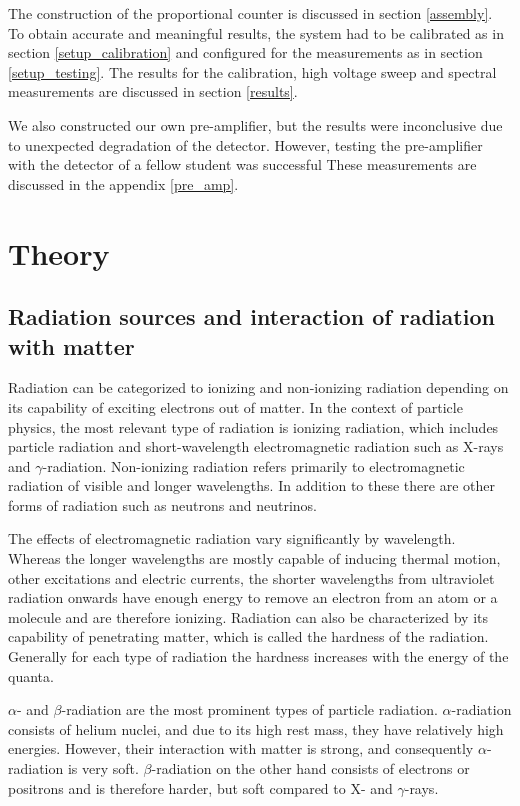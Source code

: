 \documentclass[a4paper]{article}
\begin{document}
The construction of the proportional counter is discussed in section \ref{assembly}.
To obtain accurate and meaningful results, the system had to be calibrated as in section \ref{setup_calibration} and configured for the measurements as in section \ref{setup_testing}.
The results for the calibration, high voltage sweep and spectral measurements are discussed in section \ref{results}.

We also constructed our own pre-amplifier, but the results were inconclusive due to unexpected degradation of the detector.
However, testing the pre-amplifier with the detector of a fellow student was successful
These measurements are discussed in the appendix \ref{pre_amp}.


\section{Theory}
\label{theory}

\subsection{Radiation sources and interaction of radiation with matter}
\label{sources_interaction}
Radiation can be categorized to ionizing and non-ionizing radiation depending on its capability of exciting electrons out of matter.
In the context of particle physics, the most relevant type of radiation is ionizing radiation, which includes particle radiation and short-wavelength electromagnetic radiation such as X-rays and $\gamma$-radiation.
Non-ionizing radiation refers primarily to electromagnetic radiation of visible and longer wavelengths.
In addition to these there are other forms of radiation such as neutrons and neutrinos.
\cite{knoll_radiation_2010}

The effects of electromagnetic radiation vary significantly by wavelength.
Whereas the longer wavelengths are mostly capable of inducing thermal motion, other excitations and electric currents, the shorter wavelengths from ultraviolet radiation onwards have enough energy to remove an electron from an atom or a molecule and are therefore ionizing.
Radiation can also be characterized by its capability of penetrating matter, which is called the hardness of the radiation.
Generally for each type of radiation the hardness increases with the energy of the quanta.
\cite{knoll_radiation_2010}

$\alpha$- and $\beta$-radiation are the most prominent types of particle radiation.
$\alpha$-radiation consists of helium nuclei, and due to its high rest mass, they have relatively high energies.
However, their interaction with matter is strong, and consequently $\alpha$-radiation is very soft.
$\beta$-radiation on the other hand consists of electrons or positrons and is therefore harder, but soft compared to X- and $\gamma$-rays.
\cite{knoll_radiation_2010}
\end{document}
